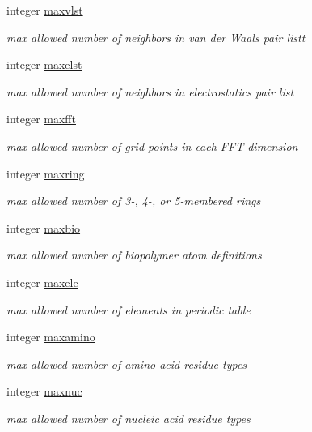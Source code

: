 \begin{DoxyCompactItemize}
integer \hyperlink{classsizes_a76b7df25996723eb856ae2da747dc6b1}{maxvlst}
\begin{DoxyCompactList}\small\item\em max allowed number of neighbors in van der Waals pair listt \end{DoxyCompactList}\item 
integer \hyperlink{classsizes_a8459ffe6b060ba2472551df9b7768d9d}{maxelst}
\begin{DoxyCompactList}\small\item\em max allowed number of neighbors in electrostatics pair list \end{DoxyCompactList}\item 
integer \hyperlink{classsizes_a1dd68238fed8b170bf5100a2de4bbbef}{maxfft}
\begin{DoxyCompactList}\small\item\em max allowed number of grid points in each F\-F\-T dimension \end{DoxyCompactList}\item 
integer \hyperlink{classsizes_a4004c53181c49aedb70b50487047657a}{maxring}
\begin{DoxyCompactList}\small\item\em max allowed number of 3-\/, 4-\/, or 5-\/membered rings \end{DoxyCompactList}\item 
integer \hyperlink{classsizes_aa64c63004cc10f0ed45fff4091596ad4}{maxbio}
\begin{DoxyCompactList}\small\item\em max allowed number of biopolymer atom definitions \end{DoxyCompactList}\item 
integer \hyperlink{classsizes_acb0f20bc59c16f604c05e7f7d8454855}{maxele}
\begin{DoxyCompactList}\small\item\em max allowed number of elements in periodic table \end{DoxyCompactList}\item 
integer \hyperlink{classsizes_ae1efed52216c909b718f9ebfe7b5d16d}{maxamino}
\begin{DoxyCompactList}\small\item\em max allowed number of amino acid residue types \end{DoxyCompactList}\item 
integer \hyperlink{classsizes_a2e996c0025a791309d434835ff499a3c}{maxnuc}
\begin{DoxyCompactList}\small\item\em max allowed number of nucleic acid residue types \end{DoxyCompactList}\item 

\end{DoxyCompactItemize}
